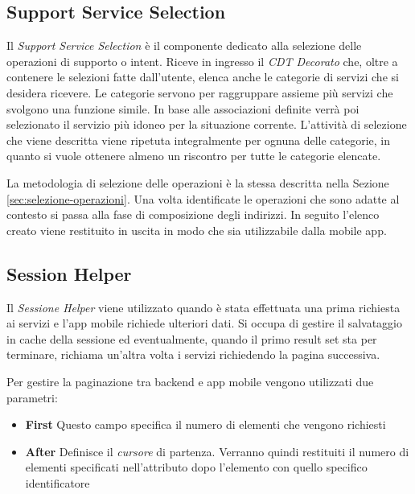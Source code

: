 \subsection{Support Service Selection\label{sec:support-service-selection}}

Il \emph{Support Service Selection} è il componente dedicato alla selezione delle operazioni di supporto o intent. Riceve in ingresso il \emph{CDT Decorato} che, oltre a contenere le selezioni fatte dall'utente, elenca anche le categorie di servizi che si desidera ricevere. Le categorie servono per raggruppare assieme più servizi che svolgono una funzione simile. In base alle associazioni definite verrà poi selezionato il servizio più idoneo per la situazione corrente. L'attività di selezione che viene descritta viene ripetuta integralmente per ognuna delle categorie, in quanto si vuole ottenere almeno un riscontro per tutte le categorie elencate.

La metodologia di selezione delle operazioni è la stessa descritta nella Sezione \ref{sec:selezione-operazioni}. Una volta identificate le operazioni che sono adatte al contesto si passa alla fase di composizione degli indirizzi. In seguito l'elenco creato viene restituito in uscita in modo che sia utilizzabile dalla mobile app.

\subsection{Session Helper\label{sec:session-helper}}

Il \emph{Sessione Helper} viene utilizzato quando è stata effettuata una prima richiesta ai servizi e l'app mobile richiede ulteriori dati. Si occupa di gestire il salvataggio in cache della sessione ed eventualmente, quando il primo result set sta per terminare, richiama un'altra volta i servizi richiedendo la pagina successiva.

Per gestire la paginazione tra backend e app mobile vengono utilizzati due parametri:

\begin{itemize}
	\item \textbf{First} Questo campo specifica il numero di elementi che vengono richiesti
	\item \textbf{After} Definisce il \emph{cursore} di partenza. Verranno quindi restituiti il numero di elementi specificati nell'attributo  dopo l'elemento con quello specifico identificatore
\end{itemize}

